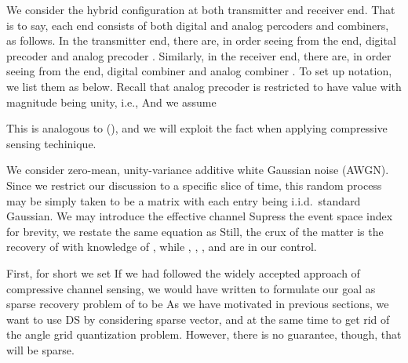We consider the hybrid configuration at both transmitter and receiver end.
That is to say, each end consists of both digital and analog percoders and combiners, as follows.
In the transmitter end, there are, in order seeing from the end, digital precoder  and analog precoder .
Similarly, in the receiver end, there are, in order seeing from the end, digital combiner  and analog combiner .
To set up notation, we list them as below.
Recall that analog precoder is restricted to have value with magnitude being unity, i.e.,
And we assume

This is analogous to (), and we will exploit the fact when applying compressive sensing techinique.

We consider zero-mean, unity-variance additive white Gaussian noise (AWGN).
Since we restrict our discussion to a specific slice of time, this random process may be simply taken to be a matrix  with each entry being i.i.d.\ standard Gaussian.
We may introduce the effective channel
Supress the event space index for brevity, we restate the same equation as
Still, the crux of the matter is the recovery of  with knowledge of , while , , , and  are in our control.

\stopsection
\startsubsection [title={Vectorization}]

First, for short we set
If we had followed the widely accepted approach of compressive channel sensing, we would have written
to formulate our goal as sparse recovery problem of  to be
As we have motivated in previous sections, we want to use DS by considering sparse vector, and at the same time to get rid of the angle grid quantization problem.
However, there is no guarantee, though, that  will be sparse.

